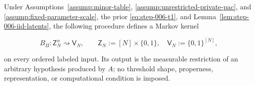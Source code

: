 \begin{proposition}
\label{prop:step-006-kernel}

Under Assumptions~\ref{assump:minor-table}, \ref{assump:unrestricted-private-pac}, and \ref{assump:fixed-parameter-scale}, the prior \eqref{eq:step-006-t1}, and Lemma~\ref{lem:step-006-iid-latents}, the following procedure defines a Markov kernel

\[
B_\Pi:\mathsf Z_N^n\rightsquigarrow\mathsf V_N,
\qquad
\mathsf Z_N:=[N]\times\{0,1\},
\quad
\mathsf V_N:=\{0,1\}^{[N]},
\tag{5}\label{eq:step-006-5}
\]

on every ordered labeled input. Its output is the measurable restriction of an arbitrary hypothesis produced by \(A\); no threshold shape, properness, representation, or computational condition is imposed.

\end{proposition}

